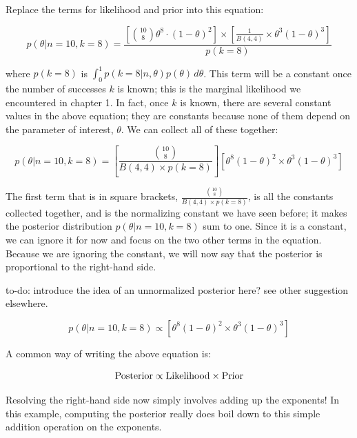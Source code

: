 \documentclass[12pt,]{krantz}
\makeatletter
\newenvironment{kframe}{%
\medskip{}
\setlength{\fboxsep}{.8em}
 \def\at@end@of@kframe{}%
 \ifinner\ifhmode%
  \def\at@end@of@kframe{\end{minipage}}%
  \begin{minipage}{\columnwidth}%
 \fi\fi%
 \def\FrameCommand##1{\hskip\@totalleftmargin \hskip-\fboxsep
 \colorbox{shadecolor}{##1}\hskip-\fboxsep
     \hskip-\linewidth \hskip-\@totalleftmargin \hskip\columnwidth}%
 \MakeFramed {\advance\hsize-\width
   \@totalleftmargin\z@ \linewidth\hsize
   \@setminipage}}%
 {\par\unskip\endMakeFramed%
 \at@end@of@kframe}
\newenvironment{rmdblock}[1]
  {
  \begin{itemize}
  \renewcommand{\labelitemi}{
    \raisebox{-.7\height}[0pt][0pt]{
      {\setkeys{Gin}{width=3em,keepaspectratio}\texttt{[image: images/\#1]}}
    }
  }
  \setlength{\fboxsep}{1em}
  \begin{kframe}
  \item
  }
  {
  \end{kframe}
  \end{itemize}
  }
\newenvironment{rmdnote}
  {\begin{rmdblock}{note}}
  {\end{rmdblock}}
\theoremstyle{definition}
\theoremstyle{definition}
\theoremstyle{definition}
\theoremstyle{remark}
\makeatother
\begin{document}
Replace the terms for likelihood and prior into this equation:

\begin{equation}
p(\theta|n=10,k=8) = \frac{\left[\binom{10}{8} \theta^8 \cdot (1-\theta)^{2}\right]  \times \left[\frac{1}{B(4,4)} \times \theta^{3} (1-\theta)^{3}\right]}{p(k=8)}
\label{eq:betaunpost}
\end{equation}

where \(p(k=8)\) is \(\int_{0}^1 p(k=8|n,\theta) p(\theta)\, d\theta\). This term will be a constant once the number of successes \(k\) is known; this is the marginal likelihood we encountered in chapter 1. In fact, once \(k\) is known, there are several constant values in the above equation; they are constants because none of them depend on the parameter of interest, \(\theta\). We can collect all of these together:

\begin{equation}
p(\theta|n=10,k=8) =   \left[ \frac{\binom{10}{8}}{B(4,4)\times p(k=8)} \right]   [\theta^8 (1-\theta)^{2} \times  \theta^{3} (1-\theta)^{3}]
\label{eq:betaunpost2}
\end{equation}

The first term that is in square brackets, \(\frac{\binom{10}{8}}{B(4,4)\times p(k=8)}\), is all the constants collected together, and is the normalizing constant we have seen before; it makes the posterior distribution \(p(\theta|n=10,k=8)\) sum to one. Since it is a constant, we can ignore it for now and focus on the two other terms in the equation. Because we are ignoring the constant, we will now say that the posterior is proportional to the right-hand side.

\begin{rmdnote}
to-do: introduce the idea of an unnormalized posterior here? see other suggestion elsewhere.
\end{rmdnote}

\begin{equation}
p(\theta|n=10,k=8) \propto   [\theta^8 (1-\theta)^{2} \times \theta^{3} (1-\theta)^{3} ]
\label{eq:betaunpost3}
\end{equation}

A common way of writing the above equation is:

\begin{equation}
\hbox{Posterior} \propto \hbox{Likelihood} \times \hbox{Prior}
\end{equation}

Resolving the right-hand side now simply involves adding up the exponents! In this example, computing the posterior really does boil down to this simple addition operation on the exponents.
\end{document}

